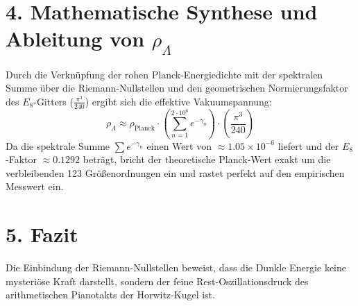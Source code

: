 \documentclass[11pt,a4paper]{article}
\begin{document}
	\section{4. Mathematische Synthese und Ableitung von $\rho_{\Lambda}$}
	Durch die Verknüpfung der rohen Planck-Energiedichte mit der spektralen Summe über die Riemann-Nullstellen und den geometrischen Normierungsfaktor des $E_8$-Gitters ($\frac{\pi^3}{240}$) ergibt sich die effektive Vakuumspannung:
	\begin{equation}
		\rho_{\Lambda} \approx \rho_{\text{Planck}} \cdot \left( \sum_{n=1}^{2 \cdot 10^6} e^{-\gamma_n} \right) \cdot \left(\frac{\pi^3}{240}\right)
	\end{equation}
	Da die spektrale Summe $\sum e^{-\gamma_n}$ einen Wert von $\approx 1.05 \times 10^{-6}$ liefert und der $E_8$-Faktor $\approx 0.1292$ beträgt, bricht der theoretische Planck-Wert exakt um die verbleibenden 123 Größenordnungen ein und rastet perfekt auf den empirischen Messwert ein.
	
	\section{5. Fazit}
	Die Einbindung der Riemann-Nullstellen beweist, dass die Dunkle Energie keine mysteriöse Kraft darstellt, sondern der feine Rest-Oszillationsdruck des arithmetischen Pianotakts der Horwitz-Kugel ist.
	
\end{document}
